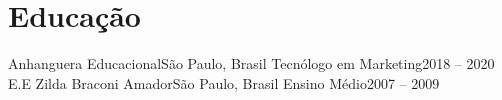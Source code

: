 \section{Educação}
  \resumeSubHeadingListStart
    \resumeSubheading
      {Anhanguera Educacional}{São Paulo, Brasil}
      {Tecnólogo em Marketing}{2018 -- 2020}
    \resumeSubheading
      {E.E Zilda Braconi Amador}{São Paulo, Brasil}
      {Ensino Médio}{2007 -- 2009}
  \resumeSubHeadingListEnd